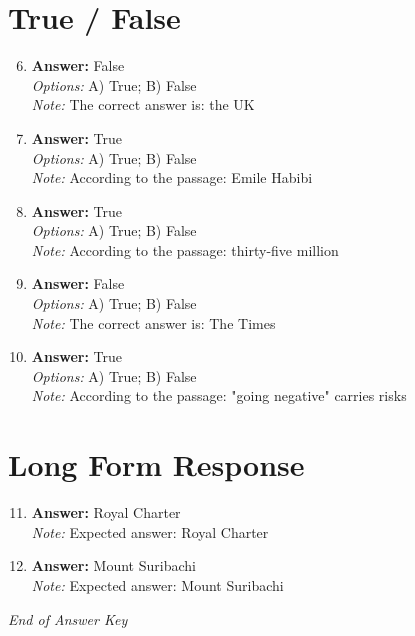 \documentclass[12pt]{article}
\begin{document}
\section*{True / False}
\begin{enumerate}[label=\arabic*.]
\setcounter{enumi}{5}
\item \textbf{Answer:} False
\\ \textit{Options:} A) True; B) False
\\ \textit{Note:} The correct answer is: the UK
\item \textbf{Answer:} True
\\ \textit{Options:} A) True; B) False
\\ \textit{Note:} According to the passage: Emile Habibi
\item \textbf{Answer:} True
\\ \textit{Options:} A) True; B) False
\\ \textit{Note:} According to the passage: thirty-five million
\item \textbf{Answer:} False
\\ \textit{Options:} A) True; B) False
\\ \textit{Note:} The correct answer is: The Times
\item \textbf{Answer:} True
\\ \textit{Options:} A) True; B) False
\\ \textit{Note:} According to the passage: "going negative" carries risks
\end{enumerate}

\section*{Long Form Response}
\begin{enumerate}[label=\arabic*.]
\setcounter{enumi}{10}
\item \textbf{Answer:} Royal Charter
\\ \textit{Note:} Expected answer: Royal Charter
\item \textbf{Answer:} Mount Suribachi
\\ \textit{Note:} Expected answer: Mount Suribachi
\end{enumerate}

\vfill
\noindent\textit{End of Answer Key}
\end{document}
